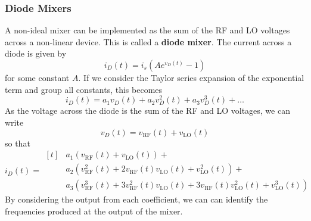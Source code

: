 \documentclass{article}
\begin{document}
\subsubsection{Diode Mixers}
A non-ideal mixer can be implemented as the sum of the RF and LO
voltages across a non-linear device. This is called a \textbf{diode
mixer}. The current across a diode is given by
\begin{equation*}
    i_D\left( t \right) = i_s \left( A e^{v_D\left( t \right)} - 1 \right)
\end{equation*}
for some constant \(A\). If we consider the Taylor series expansion of
the exponential term and group all constants, this becomes
\begin{equation*}
    i_D\left( t \right) = a_1 v_D\left( t \right) + a_2 v_D^2\left( t \right) + a_3 v_D^3\left( t \right) + \ldots
\end{equation*}
As the voltage across the diode is the sum of the RF and LO voltages,
we can write
\begin{equation*}
    v_D\left( t \right) = v_{\mathrm{RF}}\left( t \right) + v_{\mathrm{LO}}\left( t \right)
\end{equation*}
so that
\begin{equation*}
    i_D\left( t \right) =
    \begin{aligned}[t]
         & a_1 \left( v_{\mathrm{RF}}\left( t \right) + v_{\mathrm{LO}}\left( t \right) \right) +                                                                                                                                               \\
         & a_2 \left( v_{\mathrm{RF}}^2\left( t \right) + 2 v_{\mathrm{RF}}\left( t \right) v_{\mathrm{LO}}\left( t \right) + v_{\mathrm{LO}}^2\left( t \right) \right) +                                                                       \\
         & a_3 \left( v_{\mathrm{RF}}^3\left( t \right) + 3 v_{\mathrm{RF}}^2\left( t \right) v_{\mathrm{LO}}\left( t \right) + 3 v_{\mathrm{RF}}\left( t \right) v_{\mathrm{LO}}^2\left( t \right) + v_{\mathrm{LO}}^3\left( t \right) \right)
    \end{aligned}
\end{equation*}
By considering the output from each coefficient, we can can identify the
frequencies produced at the output of the mixer.
\end{document}
